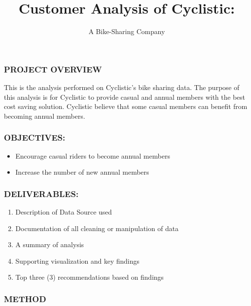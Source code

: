 \documentclass[
]{article}
\title{Customer Analysis of Cyclistic:}
\subtitle{A Bike-Sharing Company}
\author{}
\date{\vspace{-2.5em}}
\providecommand{\tightlist}{%
  \setlength{\itemsep}{0pt}\setlength{\parskip}{0pt}}
\begin{document}
\maketitle

\hypertarget{project-overview}{%
\subsubsection{PROJECT OVERVIEW}\label{project-overview}}

This is the analysis performed on Cyclistic's bike sharing data. The
purpose of this analysis is for Cyclistic to provide casual and annual
members with the best cost saving solution. Cyclistic believe that some
casual members can benefit from becoming annual members.

\hypertarget{objectives}{%
\subsubsection{OBJECTIVES:}\label{objectives}}

\begin{itemize}
\tightlist
\item
  Encourage casual riders to become annual members
\item
  Increase the number of new annual members
\end{itemize}

\hypertarget{deliverables}{%
\subsubsection{DELIVERABLES:}\label{deliverables}}

\begin{enumerate}
\def\labelenumi{\arabic{enumi}.}
\tightlist
\item
  Description of Data Source used
\item
  Documentation of all cleaning or manipulation of data
\item
  A summary of analysis
\item
  Supporting visualization and key findings
\item
  Top three (3) recommendations based on findings
\end{enumerate}

\hypertarget{method}{%
\subsubsection{METHOD}\label{method}}
\end{document}
